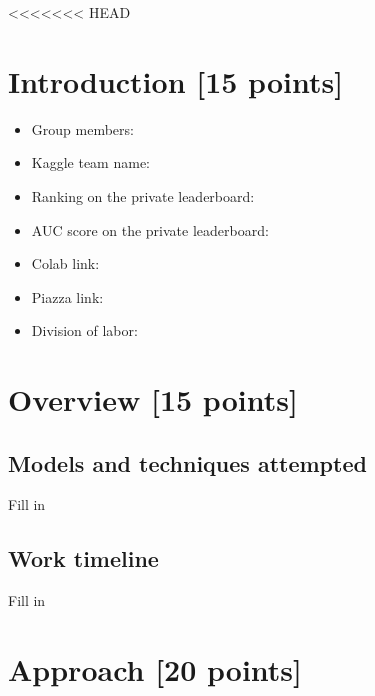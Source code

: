<<<<<<< HEAD
\newif\ifshowsolutions
\showsolutionstrue







\pagestyle{fancy}




\newpage

\section{Introduction [15 points]}
    \begin{itemize}
        \item Group members:
        \item Kaggle team name:
        \item Ranking on the private leaderboard:
        \item AUC score on the private leaderboard:
        \item Colab link:
        \item Piazza link:
        \item Division of labor:
    \end{itemize} 
\newpage

\section{Overview [15 points]}
\subsection{Models and techniques attempted}
Fill in

\subsection{Work timeline}
Fill in

\newpage

\section{Approach [20 points]}

